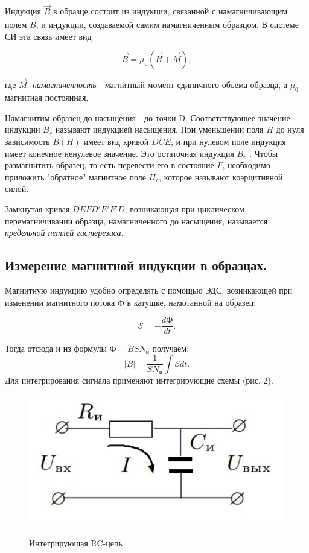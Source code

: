 \documentclass[a4paper,12pt]{article}
\begin{document}
	
	Индукция $\vec{B}$ в образце состоит из индукции, связанной с намагничивающим полем
	$\vec{B}$, и индукции, создаваемой самим намагниченным
	образцом.
	В системе СИ эта связь имеет вид
	
	$$\vec{B} = \mu_{0}(\vec{H}+\vec{M}),$$
	
	где $\vec{M}$- \textit{намагниченность} - магнитный момент единичного объема образца, а $\mu_{0}$ - магнитная постоянная.
	
	Намагнитим образец до насыщения - до точки D. Соответствующее
	значение индукции $B_{s}$ называют индукцией насыщения. При уменьшении поля $H$ до нуля зависимость $B(H)$ имеет вид кривой $DCE$, и при нулевом поле индукция имеет конечное ненулевое значение. Это остаточная индукция $B_{r}$ . Чтобы размагнитить образец, то есть перевести его в состояние
	$F$, необходимо приложить "обратное" магнитное
	поле $H_{c}$, которое называют коэрцитивной силой.
	
	Замкнутая кривая $DEFD'E'F'D$, возникающая при циклическом
	перемагничивании образца, намагниченного до насыщения, называется \textit{предельной петлей гистерезиса.}
	
	
	\subsection{Измерение магнитной индукции в образцах.}
	Магнитную индукцию удобно определять с помощью ЭДС, возникающей при изменении магнитного потока Ф в катушке, намотанной на образец:
	
	\[\mathcal{E} = -\dfrac{dФ}{dt}.\]
	
	Тогда отсюда и из формулы $Ф=BSN_{и}$ получаем:
		$$|B|=\dfrac{1}{SN_{и}}\int \mathcal{E} dt.$$
	Для интегрирования сигнала применяют интегрирующие схемы (рис. 2).
	
		\begin{figure}
		\vspace{-20pt}
		\begin{center}
			\includegraphics[width=0.7\linewidth]{gist2.jpg}
			\label{fig:sdfsafd}
		\end{center}
		\vspace{-10pt}
		\caption{Интегрирующая RC-цепь}
	\end{figure}
	
\end{document}
